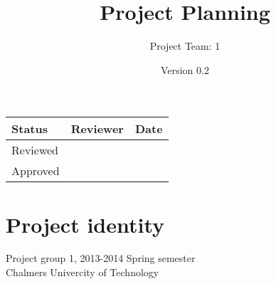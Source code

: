 \documentclass[12p]{article}
\begin{document}
\title{Project Planning}
\author{Project Team: 1}
\date{Version 0.2}


\maketitle 


\vspace*{\fill}
\begin{table}[h]
\centering
\begin{tabular}{|l|l|l|}
\hline
\textbf{Status} & \textbf{Reviewer} & \textbf{Date} \\ \hline
Reviewed        &                   &               \\ \hline
Approved        &                   &               \\ \hline
\end{tabular}
\end{table}

\thispagestyle{fancy}
\fancyhead[L]{}
\fancyhead[R]{\today}
\renewcommand{\headrulewidth}{0.4pt}
\renewcommand{\footrulewidth}{0.4pt}
\pagebreak


\vspace*{\fill}
\centering
\section*{Project identity}
\centering
Project group 1, 2013-2014 Spring semester\\
Chalmers Univercity of Technology
\end{document}
